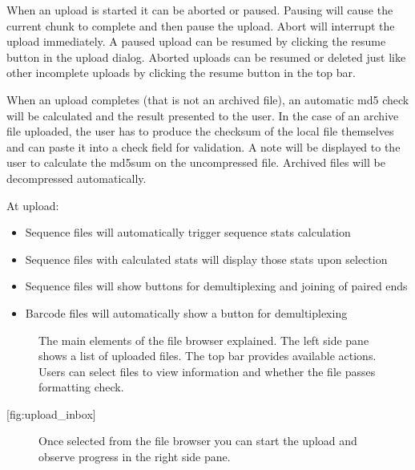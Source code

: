 \documentclass[letterpaper,10pt,english]{sphinxmanual}
\begin{document}
When an upload is started it can be aborted or paused. Pausing will
cause the current chunk to complete and then pause the upload. Abort
will interrupt the upload immediately. A paused upload can be resumed by
clicking the resume button in the upload dialog. Aborted uploads can be
resumed or deleted just like other incomplete uploads by clicking the
resume button in the top bar.

When an upload completes (that is not an archived file), an automatic
md5 check will be calculated and the result presented to the user. In
the case of an archive file uploaded, the user has to produce the
checksum of the local file themselves and can paste it into a check
field for validation. A note will be displayed to the user to calculate
the md5sum on the uncompressed file. Archived files will be decompressed
automatically.

At upload:
\begin{itemize}
\item {} 
Sequence files will automatically trigger sequence stats calculation

\item {} 
Sequence files with calculated stats will display those stats upon
selection

\item {} 
Sequence files will show buttons for demultiplexing and joining of
paired ends

\item {} 
Barcode files will automatically show a button for demultiplexing

\end{itemize}

\begin{figure}[htbp]
\centering
\capstart

\noindent{}
\caption{The main elements of the file browser explained. The left side pane
shows a list of uploaded files. The top bar provides available
actions. Users can select files to view information and whether the
file passes formatting check.}\label{\detokenize{faq:id4}}\end{figure}

{[}fig:upload\_inbox{]}

\begin{figure}[htbp]
\centering
\capstart

\noindent{}
\caption{Once selected from the file browser you can start the upload and
observe progress in the right side pane.}\label{\detokenize{faq:id5}}\end{figure}
\end{document}
